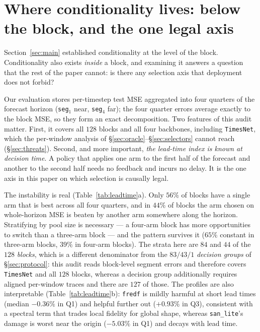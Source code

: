 \documentclass[a4paper,fleqn]{cas-sc}
\newcommand{\arm}[1]{\texttt{#1}}
\begin{document}


\section{Where conditionality lives: below the block, and the one legal axis}
\label{sec:leadtime}

Section~\ref{sec:main} established conditionality at the level of the block.
Conditionality also exists \emph{inside} a block, and examining it answers a
question that the rest of the paper cannot: is there any selection axis that
deployment does not forbid?

Our evaluation stores per-timestep test MSE aggregated into four quarters of the
forecast horizon (\texttt{seg}$_1$ near, \texttt{seg}$_4$ far); the four quarter
errors average exactly to the block MSE, so they form an exact decomposition.
Two features of this audit matter. First, it covers all $128$ blocks and all
four backbones, including \arm{TimesNet}, which the per-window analysis of
\S\ref{sec:oracle}--\S\ref{sec:selectors} cannot reach (\S\ref{sec:threats}).
Second, and more important, \emph{the lead-time index is known at decision
time}. A policy that applies one arm to the first half of the forecast and
another to the second half needs no feedback and incurs no delay. It is the one
axis in this paper on which selection is causally legal.



The instability is real (Table~\ref{tab:leadtime}a). Only $56\%$ of blocks have a
single arm that is best across all four quarters, and in $44\%$ of blocks the arm
chosen on whole-horizon MSE is beaten by another arm somewhere along the horizon.
Stratifying by pool size is necessary --- a four-arm block has more opportunities
to switch than a three-arm block --- and the pattern survives it ($65\%$ constant
in three-arm blocks, $39\%$ in four-arm blocks). The strata here are $84$ and
$44$ of the $128$ \emph{blocks}, which is a different denominator from the
$83/43/1$ \emph{decision groups} of \S\ref{sec:protocol}: this audit reads
block-level segment errors and therefore covers \arm{TimesNet} and all $128$
blocks, whereas a decision group additionally requires aligned per-window traces
and there are $127$ of those. The profiles are also
interpretable (Table~\ref{tab:leadtime}b): \arm{fredf} is mildly harmful at short
lead times (median $-0.36\%$ in Q1) and helpful further out ($+0.93\%$ in Q3),
consistent with a spectral term that trades local fidelity for global shape,
whereas \arm{san\_lite}'s damage is worst near the origin ($-5.03\%$ in Q1) and
decays with lead time.
\end{document}
